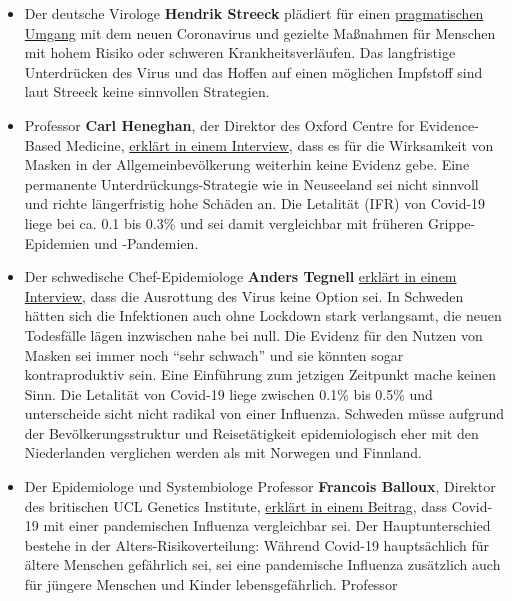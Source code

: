 \begin{itemize}
\tightlist
\item
  Der deutsche Virologe \textbf{Hendrik Streeck} plädiert für einen
  \href{https://www.merkur.de/welt/coronavirus-zweite-welle-impfstoff-streeck-virologe-warnung-drosten-massentest-infektion-zr-13834907.html}{pragmatischen
  Umgang} mit dem neuen Coronavirus und gezielte Maßnahmen für Menschen
  mit hohem Risiko oder schweren Krankheitsverläufen. Das langfristige
  Unterdrücken des Virus und das Hoffen auf einen möglichen Impfstoff
  sind laut Streeck keine sinnvollen Strategien.
\item
  Professor \textbf{Carl Heneghan}, der Direktor des Oxford Centre for
  Evidence-Based Medicine,
  \href{https://www.youtube.com/watch?v=Z3plSbCbkSA}{erklärt in einem
  Interview}, dass es für die Wirksamkeit von Masken in der
  Allgemeinbevölkerung weiterhin keine Evidenz gebe. Eine permanente
  Unterdrückungs-Strategie wie in Neuseeland sei nicht sinnvoll und
  richte längerfristig hohe Schäden an. Die Letalität (IFR) von Covid-19
  liege bei ca. 0.1 bis 0.3\% und sei damit vergleichbar mit früheren
  Grippe-Epidemien und -Pandemien.
\item
  Der schwedische Chef-Epidemiologe \textbf{Anders Tegnell}
  \href{https://www.youtube.com/watch?v=xh9wso6bEAc}{erklärt in einem
  Interview}, dass die Ausrottung des Virus keine Option sei. In
  Schweden hätten sich die Infektionen auch ohne Lockdown stark
  verlangsamt, die neuen Todesfälle lägen inzwischen nahe bei null. Die
  Evidenz für den Nutzen von Masken sei immer noch ``sehr schwach'' und
  sie könnten sogar kontraproduktiv sein. Eine Einführung zum jetzigen
  Zeitpunkt mache keinen Sinn. Die Letalität von Covid-19 liege zwischen
  0.1\% bis 0.5\% und unterscheide sicht nicht radikal von einer
  Influenza. Schweden müsse aufgrund der Bevölkerungsstruktur und
  Reisetätigkeit epidemiologisch eher mit den Niederlanden verglichen
  werden als mit Norwegen und Finnland.
\item
  Der Epidemiologe und Systembiologe Professor \textbf{Francois
  Balloux}, Direktor des britischen UCL Genetics Institute,
  \href{https://twitter.com/BallouxFrancois/status/1284513419454971905}{erklärt
  in einem Beitrag}, dass Covid-19 mit einer pandemischen Influenza
  vergleichbar sei. Der Hauptunterschied bestehe in der
  Alters-Risikoverteilung: Während Covid-19 hauptsächlich für ältere
  Menschen gefährlich sei, sei eine pandemische Influenza zusätzlich
  auch für jüngere Menschen und Kinder lebensgefährlich. Professor

\end{itemize}
